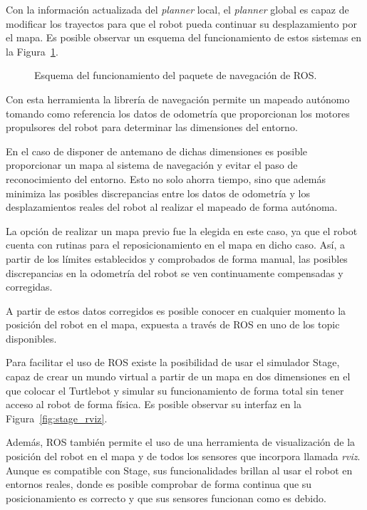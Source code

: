 Con la información actualizada del \textit{planner} local, el \textit{planner} global es capaz de modificar los trayectos para que el robot pueda continuar su desplazamiento por el mapa.
Es posible observar un esquema del funcionamiento de estos sistemas en la Figura~\ref{fig:move_base}.

\begin{figure}[H]
    \centering
    \def\svgwidth{0.8\linewidth}
    
	\caption{Esquema del funcionamiento del paquete de navegación de ROS.}
    \label{fig:move_base}
\end{figure}

Con esta herramienta la librería de navegación permite un mapeado autónomo tomando como referencia los datos de odometría que proporcionan los motores propulsores del robot para determinar las dimensiones del entorno.

En el caso de disponer de antemano de dichas dimensiones es posible proporcionar un mapa al sistema de navegación y evitar el paso de reconocimiento del entorno.
Esto no solo ahorra tiempo, sino que además minimiza las posibles discrepancias entre los datos de odometría y los desplazamientos reales del robot al realizar el mapeado de forma autónoma.

La opción de realizar un mapa previo fue la elegida en este caso, ya que el robot cuenta con rutinas para el reposicionamiento en el mapa en dicho caso.
Así, a partir de los límites establecidos y comprobados de forma manual, las posibles discrepancias en la odometría del robot se ven continuamente compensadas y corregidas.

A partir de estos datos corregidos es posible conocer en cualquier momento la posición del robot en el mapa, expuesta a través de ROS en uno de los topic disponibles.

Para facilitar el uso de ROS existe la posibilidad de usar el simulador Stage, capaz de crear un mundo virtual a partir de un mapa en dos dimensiones en el que colocar el Turtlebot y simular su funcionamiento de forma total sin tener acceso al robot de forma física.
Es posible observar su interfaz en la Figura~\ref{fig:stage_rviz}.

Además, ROS también permite el uso de una herramienta de visualización de la posición del robot en el mapa y de todos los sensores que incorpora llamada \textit{rviz}.
Aunque es compatible con Stage, sus funcionalidades brillan al usar el robot en entornos reales, donde es posible comprobar de forma continua que su posicionamiento es correcto y que sus sensores funcionan como es debido.



